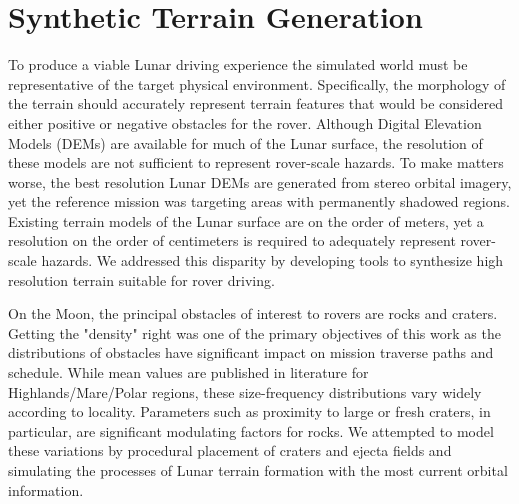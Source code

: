 \documentclass[twocolumn,letterpaper]{IEEEAerospaceCLS}  %
\begin{document}

\section{Synthetic Terrain Generation}
\label{sec:terrain-gen}

To produce a viable Lunar driving experience the simulated world must be representative of the target physical environment. 
Specifically, the morphology of the terrain should accurately represent terrain features that would be considered either positive or negative obstacles for the rover. 
Although Digital Elevation Models (DEMs) are available for much of the Lunar surface, the resolution of these models are not sufficient to represent rover-scale hazards. 
To make matters worse, the best resolution Lunar DEMs are generated from stereo orbital imagery, yet the reference mission was targeting areas with permanently shadowed regions. 
Existing terrain models of the Lunar surface are on the order of meters, yet a resolution on the order of centimeters is required to adequately represent rover-scale hazards. 
We addressed this disparity by developing tools to synthesize high resolution terrain suitable for rover driving. 

On the Moon, the principal obstacles of interest to rovers are rocks and craters. 
Getting the "density" right was one of the primary objectives of this work as the distributions of obstacles have significant impact on mission traverse paths and schedule. 
While mean values are published in literature \cite{Surveyor1968} for Highlands/Mare/Polar regions, these size-frequency distributions vary widely according to locality. 
Parameters such as proximity to large or fresh craters, in particular, are significant modulating factors for rocks. 
We attempted to model these variations by procedural placement of craters and ejecta fields and simulating the processes of Lunar terrain formation with the most current orbital information. 
\end{document}
